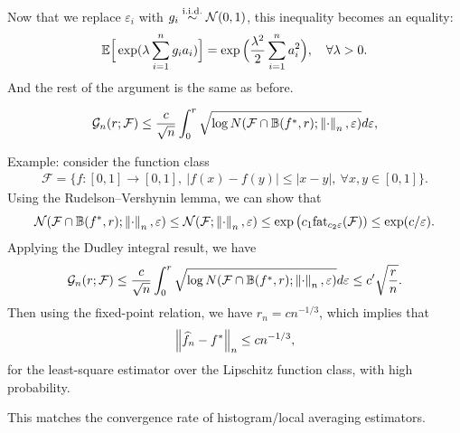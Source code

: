 \documentclass[11pt,letterpaper]{article}
\numberwithin{theorem}{lecture}
\numberwithin{proposition}{lecture}
\numberwithin{lemma}{lecture}
\numberwithin{claim}{lecture}
\numberwithin{corollary}{lecture}
\numberwithin{definition}{lecture}
\numberwithin{conjecture}{lecture}
\numberwithin{remark}{lecture}
\numberwithin{example}{lecture}
\numberwithin{equation}{lecture}
\begin{document}
Now that we replace $\varepsilon_i$ with $g_i \overset{\mathrm{i.i.d.}}{\sim} \mathcal{N} (0, 1)$, this inequality becomes an equality:
\begin{align*}
  {\mathbb{E}} \Big[ \exp (\lambda \sum_{i = 1}^n g_i a_i) \Big] = \exp \Big( \frac{\lambda^2}{2} \sum_{i = 1}^n a_i^2 \Big), \quad \forall \lambda > 0.
\end{align*}
And the rest of the argument is the same as before.
\begin{theorem}
  \begin{align*}
    \mathcal{G}_n (r; \mathcal{F}) \leq \frac{c}{\sqrt{n}} \int_0^r \sqrt{\log N (\mathcal{F} \cap \mathbb{B} (f^*, r); \left\| \cdot\right\|_{n},  \varepsilon)} d \varepsilon,
  \end{align*}
\end{theorem}
Example: consider the function class
\begin{align*}
  \mathcal{F} = \Big\{ f: [0, 1] \to [0, 1],~ |f(x) - f(y)| \leq |x - y|,~ \forall x, y \in [0, 1] \Big\}.
\end{align*}
Using the Rudelson--Vershynin lemma, we can show that
\begin{align*}
  \mathcal{N} (\mathcal{F} \cap \mathbb{B} (f^*, r); \left\| \cdot\right\|_{n},  \varepsilon) \leq  \mathcal{N} (\mathcal{F} ; \left\| \cdot\right\|_{n},  \varepsilon) \leq \exp \big( c_1 \mathrm{fat}_{c_2 \varepsilon} (\mathcal{F})) \leq \exp (c / \varepsilon).
\end{align*}
Applying the Dudley integral result, we have
\begin{align*}
  \mathcal{G}_n (r; \mathcal{F}) \leq \frac{c}{\sqrt{n}} \int_0^r \sqrt{\log N (\mathcal{F} \cap \mathbb{B} (f^*, r); \left\| \cdot\right\|_{n},  \varepsilon)} d \varepsilon \leq c' \sqrt{\frac{r}{n}}.
\end{align*}
Then using the fixed-point relation, we have $r_n = c n^{-1/3}$, which implies that
\begin{align*}
  \left\| \widehat{f}_n - f^*\right\|_{n} \leq c n^{-1/3},
\end{align*}
for the least-square estimator over the Lipschitz function class, with high probability.

This matches the convergence rate of histogram/local averaging estimators.
\end{document}
